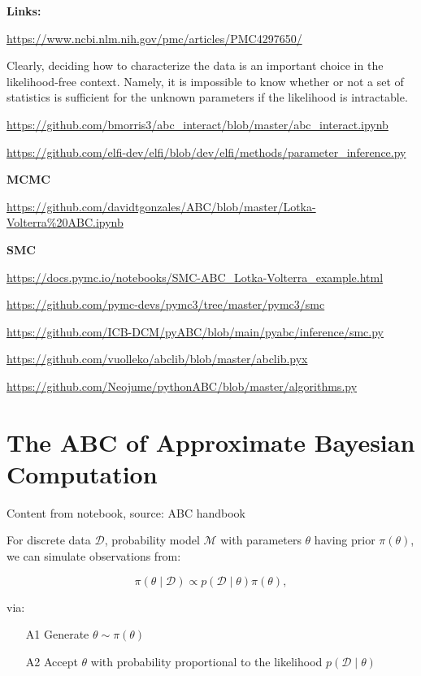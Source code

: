 \textbf{Links:}

\url{https://www.ncbi.nlm.nih.gov/pmc/articles/PMC4297650/}

Clearly, deciding how to characterize the data is an important choice in the likelihood-free context. Namely, it is impossible to know whether or not a set of statistics is sufficient for the unknown parameters if the likelihood is intractable.

\url{https://github.com/bmorris3/abc_interact/blob/master/abc_interact.ipynb}

\url{https://github.com/elfi-dev/elfi/blob/dev/elfi/methods/parameter_inference.py}

\textbf{MCMC} 

\url{https://github.com/davidtgonzales/ABC/blob/master/Lotka-Volterra%20ABC.ipynb}

\textbf{SMC} 

\url{https://docs.pymc.io/notebooks/SMC-ABC_Lotka-Volterra_example.html}

\url{https://github.com/pymc-devs/pymc3/tree/master/pymc3/smc}

\url{https://github.com/ICB-DCM/pyABC/blob/main/pyabc/inference/smc.py}

\url{https://github.com/vuolleko/abclib/blob/master/abclib.pyx}

\url{https://github.com/Neojume/pythonABC/blob/master/algorithms.py}


\section{The ABC of Approximate Bayesian Computation}\label{sec:abc_of_abc}

Content from notebook, source: ABC handbook

For discrete data $\mathcal{D}$, probability model $\mathcal{M}$ with parameters $\theta$ having prior $\pi(\theta)$, we can simulate observations from: 

\begin{equation}
    \pi (\theta \mid \mathcal{D}) \propto p(\mathcal{D} \mid \theta) \pi(\theta),
\end{equation}

via:

\begin{itemize}
    \item[A1] Generate $\theta \sim \pi(\theta)$
    \item[A2] Accept $\theta$ with probability proportional to the likelihood $p(\mathcal{D}\mid \theta)$
\end{itemize}
    

